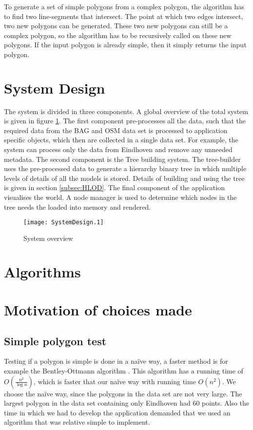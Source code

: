 To generate a set of simple polygons from a complex polygon, the algorithm has to find two line-segments that intersect. The point at which two edges intersect, two new polygons can be generated. These two new polygons can still be a complex polygon, so the algorithm has to be recursively called on these new polygons. If the input polygon is already simple, then it simply returns the input polygon.

\section{System Design}
\label{sec:SystemDesign}
The system is divided in three components. A global overview of the total system is given in figure \ref{fig:sys_overview}. The first component pre-processes all the data, such that the required data from the BAG and OSM data set is processed to application specific objects, which then are collected in a single data set. For example, the system can process only the data from Eindhoven and remove any unneeded metadata. The second component is the Tree building system. The tree-builder uses the pre-processed data to generate a hierarchy binary tree in which multiple levels of details of all the models is stored. Details of building and using the tree is given in section \ref{subsec:HLOD}. The final component of the application visualises the world. A node manager is used to determine which nodes in the tree needs the loaded into memory and rendered.
\begin{figure}[b!]
    \centering
    \ifPDFTeX
        \texttt{[image: SystemDesign.1]}
    \fi
    \caption{System overview}
    \label{fig:sys_overview}
\end{figure}

\section{Algorithms}
\label{sec:Algorithms}


\section{Motivation of choices made}
\label{sec:MotivationOfChoicesMade}
\subsection{Simple polygon test}
\label{subsec:SimplePolygonTest}
Testing if a polygon is simple is done in a naïve way, a faster method is for example the Bentley-Ottmann algorithm \cite{Bentley79}. This algorithm has a running time of $O(\frac{n^2}{\log{n}})$, which is faster that our naïve way with running time $O(n^2)$. We choose the naïve way, since the polygons in the data set are not very large. The largest polygon in the data set containing only Eindhoven had 60 points. Also the time in which we had to develop the application demanded that we used an algorithm that was relative simple to implement.

